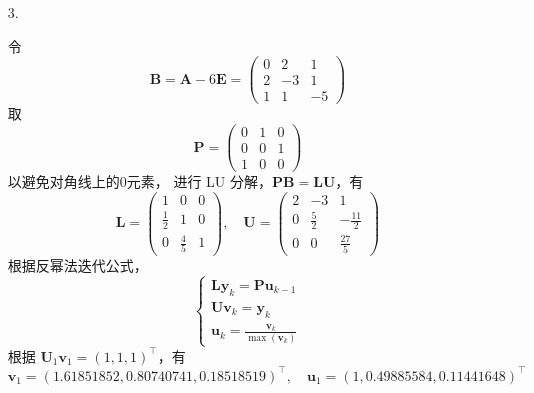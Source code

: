 \documentclass{sjtuarticle}
\begin{document}
\begin{itemize}
    \item[3.] \begin{solution}
        令
        \begin{equation*}
            \mathbf{B}=\mathbf{A}-6\mathbf{E}=\begin{pmatrix}
                0 & 2 & 1 \\ 2 & -3 & 1 \\ 1 & 1 & -5
            \end{pmatrix}
        \end{equation*}
        取\begin{equation*}
            \mathbf{P}=\begin{pmatrix}
                0 & 1 & 0 \\ 0 & 0 & 1 \\ 1 & 0 & 0 
            \end{pmatrix}
        \end{equation*}以避免对角线上的0元素，
        进行 LU 分解，$\mathbf{P}\mathbf{B}=\mathbf{L}\mathbf{U}$，有
        \begin{equation*}
            \mathbf{L}=\begin{pmatrix}
                1 & 0 & 0 \\ \frac{1}{2} & 1 & 0 \\ 0 & \frac{4}{5} & 1
            \end{pmatrix},\quad \mathbf{U}=\begin{pmatrix}
                2 & -3 & 1 \\ 0 & \frac{5}{2} & -\frac{11}{2} \\ 0 & 0 & \frac{27}{5}
            \end{pmatrix}
        \end{equation*}
        根据反幂法迭代公式，
        \begin{equation*}
            \begin{cases}
                \mathbf{L}\mathbf{y}_k=\mathbf{P}\mathbf{u}_{k-1} \\
                \mathbf{U}\mathbf{v}_k=\mathbf{y}_k\\
                \mathbf{u}_k=\frac{\mathbf{v}_k}{\max(\mathbf{v}_k)}
            \end{cases}
        \end{equation*}
        根据 $\mathbf{U}_1\mathbf{v}_1=(1,1,1)^\top$，有
        \begin{equation*}
            \mathbf{v}_1 = (1.61851852, 0.80740741, 0.18518519)^\top,\quad \mathbf{u}_1 = (1,        0.49885584, 0.11441648)^\top

\end{equation*}
\end{solution}
\end{itemize}
\end{document}
